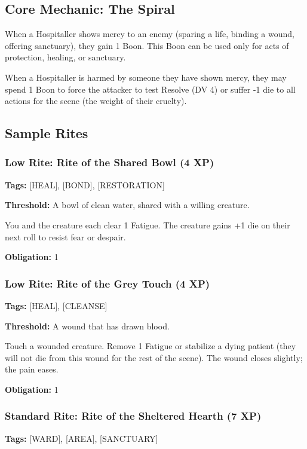 \subsection{Core Mechanic: The Spiral}

When a Hospitaller shows mercy to an enemy (sparing a life, binding a wound, offering sanctuary), they gain 1 Boon. This Boon can be used only for acts of protection, healing, or sanctuary.

When a Hospitaller is harmed by someone they have shown mercy, they may spend 1 Boon to force the attacker to test Resolve (DV 4) or suffer -1 die to all actions for the scene (the weight of their cruelty).

\subsection{Sample Rites}

\subsubsection{Low Rite: Rite of the Shared Bowl (4 XP)}

\textbf{Tags:} [HEAL], [BOND], [RESTORATION]

\textbf{Threshold:} A bowl of clean water, shared with a willing creature.

You and the creature each clear 1 Fatigue. The creature gains +1 die on their next roll to resist fear or despair.

\textbf{Obligation:} 1

\subsubsection{Low Rite: Rite of the Grey Touch (4 XP)}

\textbf{Tags:} [HEAL], [CLEANSE]

\textbf{Threshold:} A wound that has drawn blood.

Touch a wounded creature. Remove 1 Fatigue or stabilize a dying patient (they will not die from this wound for the rest of the scene). The wound closes slightly; the pain eases.

\textbf{Obligation:} 1

\subsubsection{Standard Rite: Rite of the Sheltered Hearth (7 XP)}

\textbf{Tags:} [WARD], [AREA], [SANCTUARY]

